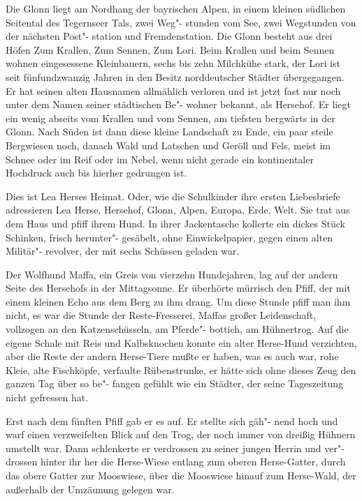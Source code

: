 Die Glonn liegt am Nordhang der bayrischen Alpen, in einem
kleinen südlichen Seitental des Tegernseer Tals, zwei Weg"-%
stunden vom See, zwei Wegstunden von der nächsten Post"-%
station und Fremdenstation. Die Glonn besteht aus drei
Höfen\dopp{} Zum Krallen, Zum Sennen, Zum Lori. Beim Krallen
und beim Sennen wohnen eingesessene Kleinbauern, sechs
bis zehn Milchkühe stark, der Lori ist seit fünfundzwanzig
Jahren in den Besitz norddeutscher Städter übergegangen.
Er hat seinen alten Hausnamen allmählich verloren und ist
jetzt fast nur noch unter dem Namen seiner städtischen Be"-%
wohner bekannt, als Hersehof. Er liegt ein wenig abseits vom
Krallen und vom Sennen, am tiefsten bergwärts in der
Glonn. Nach Süden ist dann diese kleine Landschaft zu Ende,
ein paar steile Bergwiesen noch, danach Wald und Latschen
und Geröll und Fels, meist im Schnee oder im Reif oder im
Nebel, wenn nicht gerade ein kontinentaler Hochdruck auch bis
hierher gedrungen ist.

Dies ist Lea Herses Heimat. Oder, wie die Schulkinder ihre
ersten Liebesbriefe adressieren\dopp{} Lea Herse, Hersehof, Glonn,
Alpen, Europa, Erde, Welt.
\abstand{}
Sie trat aus dem Haus und pfiff ihrem Hund. In ihrer
Jackentasche kollerte ein dickes Stück Schinken, frisch herunter"-%
gesäbelt, ohne Einwickelpapier, gegen einen alten Militär"-%
revolver, der mit sechs Schüssen geladen war.

Der Wolfhund Maffa, ein Greis von vierzehn Hundejahren,
lag auf der andern Seite des Hersehofs in der Mittagsonne.
Er überhörte mürrisch den Pfiff, der mit einem kleinen Echo
aus dem Berg zu ihm drang. Um diese Stunde pfiff man ihm
nicht, es war die Stunde der Reste-Fresserei, Maffas großer
Leidenschaft, vollzogen an den Katzenschüsseln, am Pferde"-%
bottich, am Hühnertrog. Auf die eigene Schale mit Reis und
Kalbsknochen konnte ein alter Herse-Hund verzichten, aber
die Reste der andern Herse-Tiere mußte er haben, was es
auch war, rohe Kleie, alte Fischköpfe, verfaulte Rübenstrunke,
er hätte sich ohne dieses Zeug den ganzen Tag über so be"-%
fangen gefühlt wie ein Städter, der seine Tageszeitung nicht
gefressen hat.

Erst nach dem fünften Pfiff gab er es auf. Er stellte sich gäh"-%
nend hoch und warf einen verzweifelten Blick auf den Trog,
der noch immer von dreißig Hühnern umstellt war. Dann
schlenkerte er verdrossen zu seiner jungen Herrin und ver"-%
drossen hinter ihr her\dopp{} die Herse-Wiese entlang zum oberen
Herse-Gatter, durch das obere Gatter zur Mooswiese, über
die Mooswiese hinauf zum Herse-Wald, der außerhalb der
Umzäunung gelegen war.

